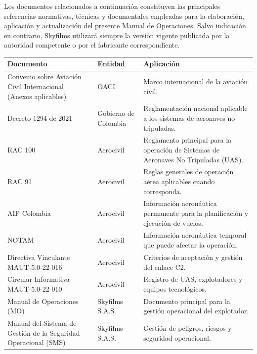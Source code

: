 Los documentos relacionados a continuación constituyen las principales referencias normativas, técnicas y documentales empleadas para la elaboración, aplicación y actualización del presente Manual de Operaciones. Salvo indicación en contrario, Skyfilms utilizará siempre la versión vigente publicada por la autoridad competente o por el fabricante correspondiente.

\begin{table}[H]
\centering
\renewcommand{\arraystretch}{1.3}
\small
\begin{tabularx}{\textwidth}{|p{4cm}|p{3cm}|X|}
\hline
\textbf{Documento} & \textbf{Entidad} & \textbf{Aplicación} \\ \hline

Convenio sobre Aviación Civil Internacional (Anexos aplicables) &
OACI &
Marco internacional de la aviación civil. \\ \hline

Decreto 1294 de 2021 &
Gobierno de Colombia &
Reglamentación nacional aplicable a los sistemas de aeronaves no tripuladas. \\ \hline

RAC 100 &
Aerocivil &
Reglamento principal para la operación de Sistemas de Aeronaves No Tripuladas (UAS). \\ \hline

RAC 91 &
Aerocivil &
Reglas generales de operación aérea aplicables cuando corresponda. \\ \hline

AIP Colombia &
Aerocivil &
Información aeronáutica permanente para la planificación y ejecución de vuelos. \\ \hline

NOTAM &
Aerocivil &
Información aeronáutica temporal que puede afectar la operación. \\ \hline

Directiva Vinculante MAUT-5.0-22-016 &
Aerocivil &
Criterios de aceptación y gestión del enlace C2. \\ \hline

Circular Informativa MAUT-5.0-22-010 &
Aerocivil &
Registro de UAS, explotadores y equipos tecnológicos. \\ \hline

Manual de Operaciones (MO) &
Skyfilms S.A.S. &
Documento principal para la gestión operacional del explotador. \\ \hline

Manual del Sistema de Gestión de la Seguridad Operacional (SMS) &
Skyfilms S.A.S. &
Gestión de peligros, riesgos y seguridad operacional. \\ \hline


\end{tabularx}
\end{table}
